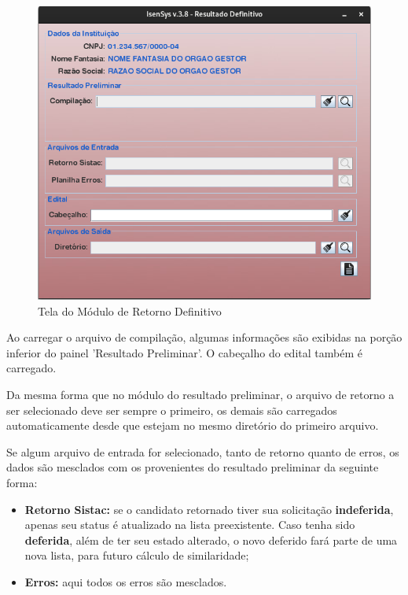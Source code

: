 \documentclass[
	12pt,			%
	openright,		%
	oneside,	
	a4paper,		%
	english,		%
	brazil			%
]{abntex2/abntex2}  %
\begin{document}
					\begin{figure}[H]
						\begin{center}
							
							\caption{Tela do Módulo de Retorno Definitivo}
							\label{retorno-def-ui}
							
							\includegraphics[scale=0.6]{img/retorno-def-ui}
							
						\end{center}
					\end{figure}
	
					Ao carregar o arquivo de compilação, algumas informações são exibidas na porção inferior do painel 'Resultado Preliminar'. O cabeçalho do edital também é carregado.
	
					Da mesma forma que no módulo do resultado preliminar, o arquivo de retorno a ser selecionado deve ser sempre o primeiro, os demais são carregados automaticamente desde que estejam no mesmo diretório do primeiro arquivo.
	
					Se algum arquivo de entrada for selecionado, tanto de retorno quanto de erros, os dados são mesclados com os provenientes do resultado preliminar da seguinte forma:
	
					\begin{itemize}
						
						\item \textbf{Retorno Sistac:} se o candidato retornado tiver sua solicitação \textbf{indeferida}, apenas seu status é atualizado na lista preexistente. Caso tenha sido \textbf{deferida}, além de ter seu estado alterado, o novo deferido fará parte de uma nova lista, para futuro cálculo de similaridade;
						
						\item \textbf{Erros:} aqui todos os erros são mesclados.
						
					\end{itemize}
	
\end{document}
